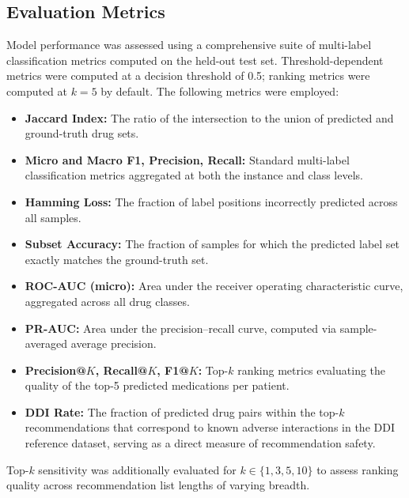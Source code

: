 \subsection{Evaluation Metrics}
Model performance was assessed using a comprehensive suite of multi-label classification metrics computed on the held-out test set. Threshold-dependent metrics were computed at a decision threshold of 0.5; ranking metrics were computed at $k = 5$ by default. The following metrics were employed:

\begin{itemize}
    \item \textbf{Jaccard Index:} The ratio of the intersection to the union of predicted and ground-truth drug sets.
    \item \textbf{Micro and Macro F1, Precision, Recall:} Standard multi-label classification metrics aggregated at both the instance and class levels.
    \item \textbf{Hamming Loss:} The fraction of label positions incorrectly predicted across all samples.
    \item \textbf{Subset Accuracy:} The fraction of samples for which the predicted label set exactly matches the ground-truth set.
    \item \textbf{ROC-AUC (micro):} Area under the receiver operating characteristic curve, aggregated across all drug classes.
    \item \textbf{PR-AUC:} Area under the precision--recall curve, computed via sample-averaged average precision.
    \item \textbf{Precision@$K$, Recall@$K$, F1@$K$:} Top-$k$ ranking metrics evaluating the quality of the top-5 predicted medications per patient.
    \item \textbf{DDI Rate:} The fraction of predicted drug pairs within the top-$k$ recommendations that correspond to known adverse interactions in the DDI reference dataset, serving as a direct measure of recommendation safety.
\end{itemize}

Top-$k$ sensitivity was additionally evaluated for $k \in \{1, 3, 5, 10\}$ to assess ranking quality across recommendation list lengths of varying breadth.
